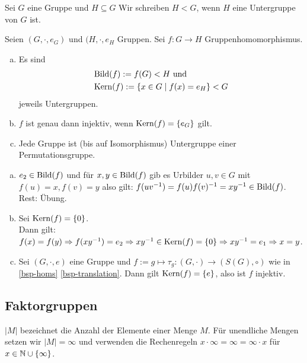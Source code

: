 \begin{konvention}
  Sei \(G\) eine Gruppe und \(H\subseteq G\)
  Wir schreiben \(H<G\), wenn \(H\) eine Untergruppe von \(G\) ist.
\end{konvention}

\begin{lemma}
  Seien \((G,\cdot,e_G)\) und \((H,\cdot,e_H\) Gruppen.
  Sei \(f:G\to H\) Gruppenhomomorphismus.
  \begin{enumerate}[(a)]
  \item Es sind
  \begin{align*}
    &\mathrm{Bild}(f):=f(G)< H \text{ und }\\
    &\mathrm{Kern}(f):=\{x\in G\mid f(x)=e_H\}< G
  \end{align*}
  jeweils Untergruppen.
  \item \(f\) ist genau dann injektiv, wenn \(\mathrm{Kern}(f)=\{e_G\}\) gilt.
  \item Jede Gruppe ist (bis auf Isomorphismus) Untergruppe einer Permutationsgruppe.
  \end{enumerate}
\end{lemma}

\begin{beweis}
  \begin{enumerate}[(a)]
  \item \(e_2\in\mathrm{Bild}(f)\) und für \(x,y\in\mathrm{Bild}(f)\) gib es Urbilder \(u,v\in G\)
    mit \(f(u)=x, f(v)=y\) also gilt: \(f(uv^{-1})=f(u)f(v)^{-1}=xy^{-1}\in\mathrm{Bild}(f)\).
    Rest: Übung.
  \item Sei \(\mathrm{Kern}(f)=\{0\}\). \\
    Dann gilt: \(f(x)=f(y) \Rightarrow f(xy^{-1})=e_2 \Rightarrow xy^{-1}\in\mathrm{Kern}(f)=\{0\} \Rightarrow xy^{-1}=e_1 \Rightarrow x=y\). 
  \item Sei \((G,\cdot,e)\) eine Gruppe und \(f:=g\mapsto \tau_g:(G,\cdot)\to (S(G),\circ)\) wie in \ref{bsp-homs} \ref{bsp-translation}. Dann gilt \(\mathrm{Kern}(f)=\{e\}\), also ist \(f\) injektiv.
  \end{enumerate}
\end{beweis}

\subsection{Faktorgruppen}

\begin{konvention}
  \(|M|\) bezeichnet die Anzahl der Elemente einer Menge \(M\).
  Für unendliche Mengen setzen wir \(|M|=\infty\) und verwenden die Rechenregeln \(x\cdot \infty=\infty=\infty\cdot x\) für \(x\in\mathbb{N}\cup\{\infty\}\).
\end{konvention}


